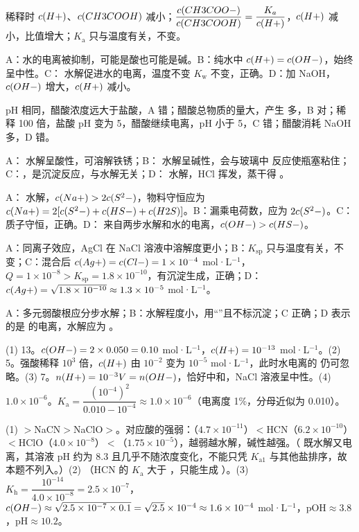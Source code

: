 \begin{jiexilist}
\item {}稀释时 $c(H+)$、$c(CH3COOH)$ 减小；$\dfrac{c(CH3COO-)}{c(CH3COOH)}=\dfrac{K_a}{c(H+)}$，$c(H+)$ 减小，比值增大；$K_\text{a}$ 只与温度有关，不变。
\item {}A：水的电离被抑制，可能是酸也可能是碱。B：纯水中 $c(H+)=c(OH-)$，始终呈中性。C： 水解促进水的电离，温度不变 $K_\text{w}$ 不变，正确。D：加 NaOH，$c(OH-)$ 增大，$c(H+)$ 减小。
\item {}pH 相同，醋酸浓度远大于盐酸，A 错；醋酸总物质的量大，产生  多，B 对；稀释 100 倍，盐酸 pH 变为 5，醋酸继续电离，pH 小于 5，C 错；醋酸消耗 NaOH 多，D 错。
\item {}A： 水解呈酸性，可溶解铁锈；B： 水解呈碱性，会与玻璃中  反应使瓶塞粘住；C：，是沉淀反应，与水解无关；D： 水解，HCl 挥发，蒸干得 。
\item {}A： 水解，$c(Na+)>2c(S^2-)$，物料守恒应为 $c(Na+)=2[c(S^2-)+c(HS-)+c(H2S)]$。B：漏乘电荷数，应为 $2c(S^2-)$。C：质子守恒，正确。D： 来自两步水解和水的电离，$c(OH-)>c(HS-)$。
\item {}A：同离子效应，AgCl 在 NaCl 溶液中溶解度更小；B：$K_\text{sp}$ 只与温度有关，不变；C：混合后 $c(Ag+)=c(Cl-)=1\times10^{-4}$ mol·L$^{-1}$，$Q=1\times10^{-8}>K_\text{sp}=1.8\times10^{-10}$，有沉淀生成，正确；D：$c(Ag+)=\sqrt{1.8\times10^{-10}}\approx1.3\times10^{-5}$ mol·L$^{-1}$。
\item {}A：多元弱酸根应分步水解；B：水解程度小，用“\ce{<=>}”且不标沉淀；C 正确；D 表示的是  的电离，水解应为 。
\item (1) 13。$c(OH-)=2\times0.050=0.10$ mol·L$^{-1}$，$c(H+)=10^{-13}$ mol·L$^{-1}$。(2) 5。强酸稀释 $10^3$ 倍，$c(H+)$ 由 $10^{-2}$ 变为 $10^{-5}$ mol·L$^{-1}$，此时水电离的  仍可忽略。(3) 7。$n(H+)=10^{-3}V=n(OH-)$，恰好中和，NaCl 溶液呈中性。(4) $1.0\times10^{-6}$。$K_\text{a}=\dfrac{(10^{-4})^2}{0.010-10^{-4}}\approx1.0\times10^{-6}$（电离度 1\%，分母近似为 0.010）。
\item (1) $>$NaCN$>$NaClO$>$。对应酸的强弱：（$4.7\times10^{-11}$）$<$HCN（$6.2\times10^{-10}$）$<$HClO（$4.0\times10^{-8}$）$<$（$1.75\times10^{-5}$），越弱越水解，碱性越强。（ 既水解又电离，其溶液 pH 约为 8.3 且几乎不随浓度变化，不能只凭 $K_{\text{a}1}$ 与其他盐排序，故本题不列入。）(2) （HCN 的 $K_\text{a}$ 大于 ，只能生成 ）。(3) $K_\text{h}=\dfrac{10^{-14}}{4.0\times10^{-8}}=2.5\times10^{-7}$，$c(OH-)\approx\sqrt{2.5\times10^{-7}\times0.1}=\sqrt{2.5}\times10^{-4}\approx1.6\times10^{-4}$ mol·L$^{-1}$，pOH$\approx3.8$，pH$\approx10.2$。

\end{jiexilist}

